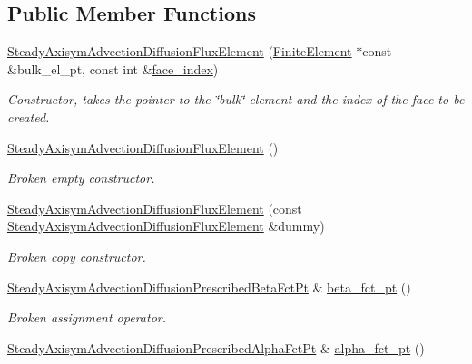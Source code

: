 \subsection*{Public Member Functions}
\begin{DoxyCompactItemize}
\item 
\hyperlink{classoomph_1_1SteadyAxisymAdvectionDiffusionFluxElement_a6e5055bf105673d5dfec3a1b8b9863a1}{Steady\+Axisym\+Advection\+Diffusion\+Flux\+Element} (\hyperlink{classoomph_1_1FiniteElement}{Finite\+Element} $\ast$const \&bulk\+\_\+el\+\_\+pt, const int \&\hyperlink{classoomph_1_1FaceElement_a478d577ac6db67ecc80f1f02ae3ab170}{face\+\_\+index})
\begin{DoxyCompactList}\small\item\em Constructor, takes the pointer to the \char`\"{}bulk\char`\"{} element and the index of the face to be created. \end{DoxyCompactList}\item 
\hyperlink{classoomph_1_1SteadyAxisymAdvectionDiffusionFluxElement_a5bc0b6dd3ea00a4eb9d88bc0cba1b9cd}{Steady\+Axisym\+Advection\+Diffusion\+Flux\+Element} ()
\begin{DoxyCompactList}\small\item\em Broken empty constructor. \end{DoxyCompactList}\item 
\hyperlink{classoomph_1_1SteadyAxisymAdvectionDiffusionFluxElement_a0baf681da17e525890c7115e87510aad}{Steady\+Axisym\+Advection\+Diffusion\+Flux\+Element} (const \hyperlink{classoomph_1_1SteadyAxisymAdvectionDiffusionFluxElement}{Steady\+Axisym\+Advection\+Diffusion\+Flux\+Element} \&dummy)
\begin{DoxyCompactList}\small\item\em Broken copy constructor. \end{DoxyCompactList}\item 
\hyperlink{classoomph_1_1SteadyAxisymAdvectionDiffusionFluxElement_acaec4345326b85f4689043efd2cd1e1c}{Steady\+Axisym\+Advection\+Diffusion\+Prescribed\+Beta\+Fct\+Pt} \& \hyperlink{classoomph_1_1SteadyAxisymAdvectionDiffusionFluxElement_a6e6c927f4aa0f0f3bf07c5b0474254f2}{beta\+\_\+fct\+\_\+pt} ()
\begin{DoxyCompactList}\small\item\em Broken assignment operator. \end{DoxyCompactList}\item 
\hyperlink{classoomph_1_1SteadyAxisymAdvectionDiffusionFluxElement_a28cea997740e6174b3e3583d704229ce}{Steady\+Axisym\+Advection\+Diffusion\+Prescribed\+Alpha\+Fct\+Pt} \& \hyperlink{classoomph_1_1SteadyAxisymAdvectionDiffusionFluxElement_a00b6f2f505ed91d63435537d1ca8b8f0}{alpha\+\_\+fct\+\_\+pt} ()

\end{DoxyCompactItemize}

